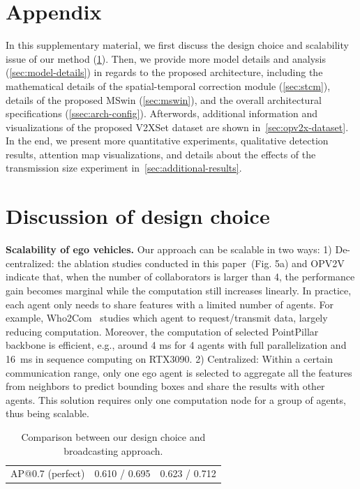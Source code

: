 \documentclass[runningheads]{llncs}
\begin{document}
\appendix
\section*{Appendix}
In this supplementary material, we first discuss the design choice and scalability issue of our method (\cref{sec:design-choice}). Then, we provide more model details and analysis (\cref{sec:model-details}) in regards to the proposed architecture, including the mathematical details of the spatial-temporal correction module (\cref{sec:stcm}), details of the proposed MSwin (\cref{sec:mswin}), and the overall architectural specifications (\cref{ssec:arch-config}). Afterwords, additional information and visualizations of the proposed V2XSet dataset are shown in~\cref{sec:opv2x-dataset}. In the end, we present more quantitative experiments, qualitative detection results, attention map visualizations, and  details about the effects of the transmission size experiment in~\cref{sec:additional-results}.

\section{Discussion of design choice}
\label{sec:design-choice}
\noindent\textbf{Scalability of ego vehicles.}
Our approach can be scalable in two ways: 1) {De-centralized}: the ablation studies conducted in this paper~(Fig. 5a) and OPV2V~\cite{xu2021opv2v} indicate that, when the number of collaborators is larger than 4, the performance gain becomes marginal while the computation still increases linearly. In practice, each agent only needs to share features with a limited number of agents. For example, Who2Com~\cite{liu2020who2com} studies which agent to request/transmit data, largely reducing computation. Moreover, the computation of selected PointPillar backbone is efficient, e.g., around 4 ms for 4 agents with full parallelization and 16~ms in sequence computing on RTX3090. 2) {Centralized}: Within a certain communication range, only one ego agent is selected to aggregate all the features from neighbors to predict bounding boxes and share the results with other agents. This solution requires only one computation node for a group of agents, thus being scalable. 
\begin{table}[h]
\vspace{-4mm}
    \centering
    \footnotesize
    \def\xwidth{0.245}
    \renewcommand\thetable{T0}
    \caption{Comparison between our design choice and broadcasting approach.}
    \setlength{\tabcolsep}{2pt}
    \begin{tabular}{c|c|c}
         \cellcolor{lightgray}{} &\cellcolor{lightgray}{DiscoNet (broad. / ours)}&\cellcolor{lightgray}{V2X-ViT (broad. / ours)}  \\
        \toprule
         AP@0.7 (perfect)&  0.610 / 0.695 & 0.623 / 0.712  \\
         \bottomrule
    \end{tabular}
    \label{tab:design_choice}
\vspace{-3mm}
\end{table}
\end{document}

